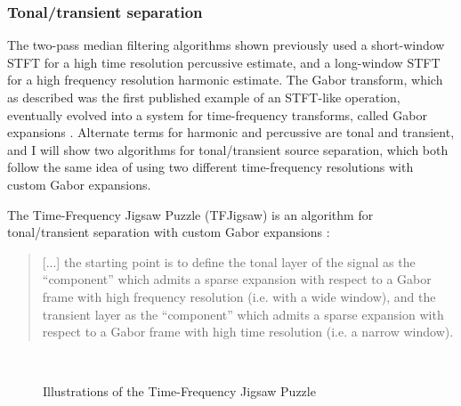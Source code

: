 \documentclass[report.tex]{subfiles}
\begin{document}
\subsubsection{Tonal/transient separation}
\label{sec:custgabor}

The two-pass median filtering algorithms shown previously used a short-window STFT for a high time resolution percussive estimate, and a long-window STFT for a high frequency resolution harmonic estimate. The Gabor transform, which as described was the first published example of an STFT-like operation, eventually evolved into a system for time-frequency transforms, called Gabor expansions \parencite{gaborexpansion}. Alternate terms for harmonic and percussive are tonal and transient, and I will show two algorithms for tonal/transient source separation, which both follow the same idea of using two different time-frequency resolutions with custom Gabor expansions.

The Time-Frequency Jigsaw Puzzle (TFJigsaw) is an algorithm for tonal/transient separation with custom Gabor expansions \parencite[6--7]{tfjigsaw}:
\begin{quote}
	[...] the starting point is to define the tonal layer of the signal as the ``component'' which admits a sparse expansion with respect to a Gabor frame with high frequency resolution (i.e. with a wide window), and the transient layer as the ``component'' which admits a sparse expansion with respect to a Gabor frame with high time resolution (i.e. a narrow window).
\end{quote}

\begin{figure}[ht]
	\centering
	\\
	\caption{Illustrations of the Time-Frequency Jigsaw Puzzle \parencite[3, 4]{tfjigsaw}}
	\label{fig:supertiles}
\end{figure}
\end{document}
